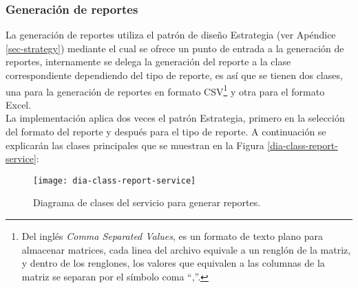 \subsubsection{Generación de reportes}
La generación de reportes utiliza el patrón de diseño Estrategia (ver Apéndice \ref{sec-strategy}) mediante el cual se ofrece un punto de entrada a la generación de reportes, internamente se delega la generación del reporte a la clase correspondiente dependiendo del tipo de reporte, es así que se tienen dos clases, una para la generación de reportes en formato CSV\footnote{Del inglés \textit{Comma Separated Values}, es un formato de texto plano para almacenar matrices, cada linea del archivo equivale a un renglón de la matriz, y dentro de los renglones, los valores que equivalen a las columnas de la matriz se separan por el símbolo coma ``,''.} y otra para el formato Excel\textsuperscript{\textcopyright}.\\
La implementación aplica dos veces el patrón Estrategia, primero en la selección del formato del reporte y después para el tipo de reporte. A continuación se explicarán las clases principales que se muestran en la Figura \ref{dia-class-report-service}:

\begin{figure}[h]
	\centering
	\texttt{[image: dia-class-report-service]}
	\caption{Diagrama de clases del servicio para generar reportes.}
	\label{fig:dia-class-report-service}
\end{figure}

